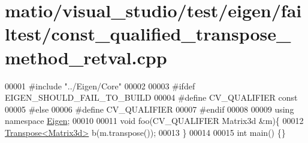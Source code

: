 \hypertarget{matio_2visual__studio_2test_2eigen_2failtest_2const__qualified__transpose__method__retval_8cpp_source}{}\section{matio/visual\+\_\+studio/test/eigen/failtest/const\+\_\+qualified\+\_\+transpose\+\_\+method\+\_\+retval.cpp}
\label{matio_2visual__studio_2test_2eigen_2failtest_2const__qualified__transpose__method__retval_8cpp_source}

\begin{DoxyCode}
00001 \textcolor{preprocessor}{#include "../Eigen/Core"}
00002 
00003 \textcolor{preprocessor}{#ifdef EIGEN\_SHOULD\_FAIL\_TO\_BUILD}
00004 \textcolor{preprocessor}{#define CV\_QUALIFIER const}
00005 \textcolor{preprocessor}{#else}
00006 \textcolor{preprocessor}{#define CV\_QUALIFIER}
00007 \textcolor{preprocessor}{#endif}
00008 
00009 \textcolor{keyword}{using namespace }\hyperlink{namespace_eigen}{Eigen};
00010 
00011 \textcolor{keywordtype}{void} foo(CV\_QUALIFIER Matrix3d &m)\{
00012     \hyperlink{group___core___module_class_eigen_1_1_transpose}{Transpose<Matrix3d>} b(m.transpose());
00013 \}
00014 
00015 \textcolor{keywordtype}{int} main() \{\}
\end{DoxyCode}
